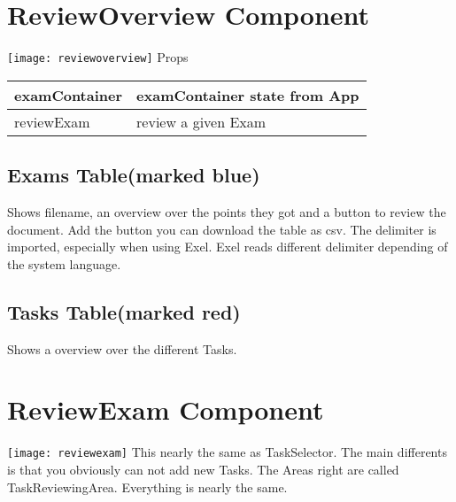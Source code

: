 \section{ReviewOverview Component}
\texttt{[image: reviewoverview]}
Props\\
\begin{tabularx}{\textwidth}{|l|X|} 
\hline
examContainer & examContainer state from App \\
\hline
reviewExam & review a given Exam \\
\hline
\end{tabularx}
\subsection{Exams Table(marked blue)}
Shows filename, an overview over the points they got and a button to
review the document.
Add the button you can download the table as csv. The delimiter is
imported, especially when using Exel. Exel reads different delimiter
depending of the system language. 
\subsection{Tasks Table(marked red)}
Shows a overview over the different Tasks.

\section{ReviewExam Component}
\texttt{[image: reviewexam]}
This nearly the same as TaskSelector. The main differents is that
you obviously can not add new Tasks. The Areas right are called
TaskReviewingArea. Everything is nearly the same.



